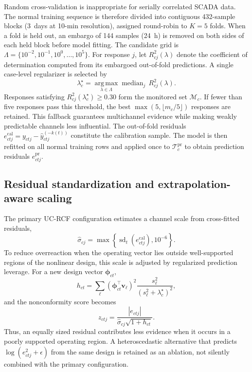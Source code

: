 Random cross-validation is inappropriate for serially correlated SCADA data.
The normal training sequence is therefore divided into contiguous 432-sample
blocks (3~days at 10-min resolution), assigned round-robin to $K=5$ folds. When
a fold is held out, an embargo of 144 samples (24~h) is removed on both sides of
each held block before model fitting. The candidate grid is
$\Lambda=\{10^{-2},10^{-1},10^{0},\ldots,10^{5}\}$. For response $j$, let
$R^{2}_{cj}(\lambda)$ denote the coefficient of determination computed from
its embargoed out-of-fold predictions. A single case-level regularizer is
selected by
\begin{equation}
\lambda_c^{\star}=
\underset{\lambda\in\Lambda}{\operatorname*{arg\,max}}
\operatorname{median}_{j}\,R^{2}_{cj}(\lambda).
\label{eq:lambda_selection}
\end{equation}
Responses satisfying $R^{2}_{cj}(\lambda_c^{\star})\geq0.30$ form the monitored
set $\mathcal{M}_c$. If fewer than five responses pass this threshold, the best
$\max(5,\lfloor m_c/5\rfloor)$ responses are retained. This fallback guarantees
multichannel evidence while making weakly predictable channels less influential.
The out-of-fold residuals
$e^{\mathrm{cal}}_{ctj}=y_{ctj}-\widehat{y}^{(-k(t))}_{ctj}$ constitute the
calibration sample. The model is then refitted on all normal training rows and
applied once to $\mathcal{T}^{\mathrm{pr}}_c$ to obtain prediction residuals
$e^{\mathrm{pr}}_{ctj}$.

\subsection{Residual standardization and extrapolation-aware scaling}

The primary UC-RCF configuration estimates a channel scale from cross-fitted
residuals,
\begin{equation}
\widehat{\sigma}_{cj}=
\max\left\{\operatorname{sd}_{t}
\left(e^{\mathrm{cal}}_{ctj}\right),10^{-6}\right\}.
\label{eq:global_scale}
\end{equation}
To reduce overreaction when the operating vector lies outside well-supported
regions of the nonlinear design, this scale is adjusted by regularized
prediction leverage. For a new design vector $\boldsymbol{\phi}_{ct}$,
\begin{equation}
h_{ct}=\sum_{\ell}
\left(\boldsymbol{\phi}_{ct}^{\top}\mathbf{v}_{\ell}\right)^2
\frac{s_{\ell}^{2}}{(s_{\ell}^{2}+\lambda_c^{\star})^{2}},
\label{eq:regularized_leverage}
\end{equation}
and the nonconformity score becomes
\begin{equation}
z_{ctj}=
\frac{|e_{ctj}|}
{\widehat{\sigma}_{cj}\sqrt{1+h_{ct}}}.
\label{eq:nonconformity}
\end{equation}
Thus, an equally sized residual contributes less evidence when it occurs in a
poorly supported operating region. A heteroscedastic alternative that predicts
$\log(e_{ctj}^{2}+\epsilon)$ from the same design is retained as an ablation,
not silently combined with the primary configuration.

